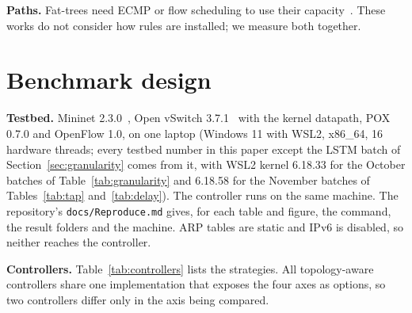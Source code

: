 \documentclass[sigconf]{acmart}
\begin{document}
\textbf{Paths.} Fat-trees need ECMP or flow scheduling to use their capacity~\cite{alfares,hedera}. These works do not consider how rules are installed; we measure both together.

\section{Benchmark design}\label{sec:design}

\textbf{Testbed.} Mininet 2.3.0~\cite{mininet}, Open vSwitch 3.7.1~\cite{ovs} with the kernel datapath, POX 0.7.0 and OpenFlow 1.0, on one laptop (Windows 11 with WSL2, x86\_64, 16 hardware threads; every testbed number in this paper except the LSTM batch of Section~\ref{sec:granularity} comes from it, with WSL2 kernel 6.18.33 for the October batches of Table~\ref{tab:granularity} and 6.18.58 for the November batches of Tables~\ref{tab:tap} and~\ref{tab:delay}). The controller runs on the same machine. The repository's \texttt{docs/Reproduce.md} gives, for each table and figure, the command, the result folders and the machine. ARP tables are static and IPv6 is disabled, so neither reaches the controller.

\textbf{Controllers.} Table~\ref{tab:controllers} lists the strategies. All topology-aware controllers share one implementation that exposes the four axes as options, so two controllers differ only in the axis being compared.
\end{document}
